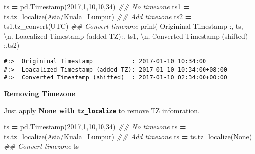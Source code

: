 \documentclass[
]{book}
\newenvironment{Shaded}{\begin{snugshade}}{\end{snugshade}}
\newcommand{\BuiltInTok}[1]{#1}
\newcommand{\CharTok}[1]{\textcolor[rgb]{0.5,0.5,0.5}{#1}}
\newcommand{\CommentTok}[1]{\textcolor[rgb]{0.37,0.37,0.37}{\textit{#1}}}
\newcommand{\DecValTok}[1]{\textcolor[rgb]{0.06,0.06,0.06}{#1}}
\newcommand{\NormalTok}[1]{#1}
\newcommand{\OperatorTok}[1]{\textcolor[rgb]{0.43,0.43,0.43}{\textbf{#1}}}
\newcommand{\StringTok}[1]{\textcolor[rgb]{0.5,0.5,0.5}{#1}}
\newcommand{\VariableTok}[1]{\textcolor[rgb]{0,0,0}{#1}}
\begin{document}
\begin{Shaded}
\begin{Highlighting}[]
\NormalTok{ts }\OperatorTok{=}\NormalTok{ pd.Timestamp(}\DecValTok{2017}\NormalTok{,}\DecValTok{1}\NormalTok{,}\DecValTok{10}\NormalTok{,}\DecValTok{10}\NormalTok{,}\DecValTok{34}\NormalTok{)        }\CommentTok{\#\# No timezone}
\NormalTok{ts1 }\OperatorTok{=}\NormalTok{ ts.tz\_localize(}\StringTok{\textquotesingle{}Asia/Kuala\_Lumpur\textquotesingle{}}\NormalTok{)  }\CommentTok{\#\# Add timezone}
\NormalTok{ts2 }\OperatorTok{=}\NormalTok{ ts1.tz\_convert(}\StringTok{\textquotesingle{}UTC\textquotesingle{}}\NormalTok{)                 }\CommentTok{\#\# Convert timezone}
\BuiltInTok{print}\NormalTok{(}\StringTok{\textquotesingle{} Origininal Timestamp           :\textquotesingle{}}\NormalTok{, ts,  }\StringTok{\textquotesingle{}}\CharTok{\textbackslash{}n}\StringTok{\textquotesingle{}}\NormalTok{,}
      \StringTok{\textquotesingle{}Loacalized Timestamp (added TZ):\textquotesingle{}}\NormalTok{, ts1, }\StringTok{\textquotesingle{}}\CharTok{\textbackslash{}n}\StringTok{\textquotesingle{}}\NormalTok{,}
      \StringTok{\textquotesingle{}Converted Timestamp (shifted)  :\textquotesingle{}}\NormalTok{,ts2)}
\end{Highlighting}
\end{Shaded}

\begin{verbatim}
#:>  Origininal Timestamp           : 2017-01-10 10:34:00 
#:>  Loacalized Timestamp (added TZ): 2017-01-10 10:34:00+08:00 
#:>  Converted Timestamp (shifted)  : 2017-01-10 02:34:00+00:00
\end{verbatim}

\textbf{Removing Timezone}

Just apply \textbf{None with \texttt{tz\_localize}} to remove TZ infomration.

\begin{Shaded}
\begin{Highlighting}[]
\NormalTok{ts }\OperatorTok{=}\NormalTok{ pd.Timestamp(}\DecValTok{2017}\NormalTok{,}\DecValTok{1}\NormalTok{,}\DecValTok{10}\NormalTok{,}\DecValTok{10}\NormalTok{,}\DecValTok{34}\NormalTok{)        }\CommentTok{\#\# No timezone}
\NormalTok{ts }\OperatorTok{=}\NormalTok{ ts.tz\_localize(}\StringTok{\textquotesingle{}Asia/Kuala\_Lumpur\textquotesingle{}}\NormalTok{)  }\CommentTok{\#\# Add timezone}
\NormalTok{ts }\OperatorTok{=}\NormalTok{ ts.tz\_localize(}\VariableTok{None}\NormalTok{)                 }\CommentTok{\#\# Convert timezone}
\NormalTok{ts}
\end{Highlighting}
\end{Shaded}
\end{document}
